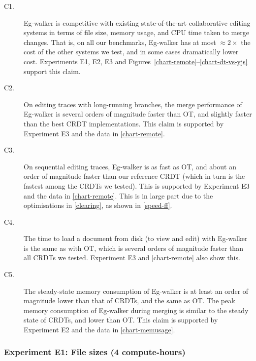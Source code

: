 \documentclass[sigplan,10pt]{acmart}
\begin{document}


\begin{description}
    \item[C1.] Eg-walker is competitive with existing state-of-the-art collaborative editing systems in terms of file size, memory usage, and CPU time taken to merge changes.
    That is, on all our benchmarks, Eg-walker has at most $\approx 2\times$ the cost of the other systems we test, and in some cases dramatically lower cost.
    Experiments E1, E2, E3 and Figures~\ref{chart-remote}--\ref{chart-dt-vs-yjs} support this claim.
    \item[C2.] On editing traces with long-running branches, the merge performance of Eg-walker is several orders of magnitude faster than OT, and slightly faster than the best CRDT implementations.
    This claim is supported by Experiment E3 and the data in \autoref{chart-remote}.
    \item[C3.] On sequential editing traces, Eg-walker is as fast as OT, and about an order of magnitude faster than our reference CRDT (which in turn is the fastest among the CRDTs we tested).
    This is supported by Experiment E3 and the data in \autoref{chart-remote}.
    This is in large part due to the optimisations in \autoref{clearing}, as shown in \autoref{speed-ff}.
    \item[C4.] The time to load a document from disk (to view and edit) with Eg-walker is the same as with OT, which is several orders of magnitude faster than all CRDTs we tested.
    Experiment E3 and \autoref{chart-remote} also show this.
    \item[C5.] The steady-state memory consumption of Eg-walker is at least an order of magnitude lower than that of CRDTs, and the same as OT.
    The peak memory consumption of Eg-walker during merging is similar to the steady state of CRDTs, and lower than OT.
    This claim is supported by Experiment E2 and the data in \autoref{chart-memusage}.
\end{description}

\subsubsection{Experiment E1: File sizes (4 compute-hours)}
\end{document}
